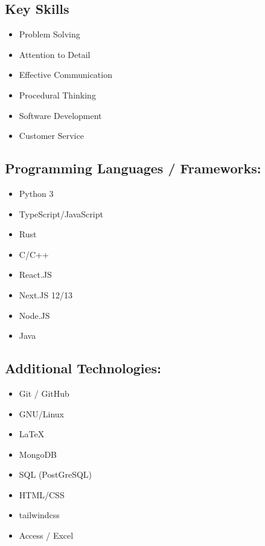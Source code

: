\documentclass[9pt]{extarticle}
\begin{document}
\begin{minipage}{0.3\textwidth}
	\raggedright
	\begin{tcolorbox}[colback=grey]

		\section{Key Skills}

		\begin{itemize}[leftmargin=*]
			\item Problem Solving
			\item Attention to Detail
			\item Effective Communication
			\item Procedural Thinking
			\item Software Development
			\item Customer Service

		\end{itemize}

		\subsection{Programming Languages / Frameworks:}
		\begin{itemize}[leftmargin=*]

			\item Python 3
			\item TypeScript/JavaScript
			\item Rust
			\item C/C++
			\item React.JS
			\item Next.JS 12/13
			\item Node.JS
			\item Java


		\end{itemize}

		\subsection{Additional Technologies:}
		\begin{itemize}[leftmargin=*]
			\item Git / GitHub
			\item GNU/Linux
			\item LaTeX
			\item MongoDB
			\item SQL (PostGreSQL)
			\item HTML/CSS
			\item tailwindcss
			\item Access / Excel
		\end{itemize}

	\end{tcolorbox}

\end{minipage}
\end{document}
